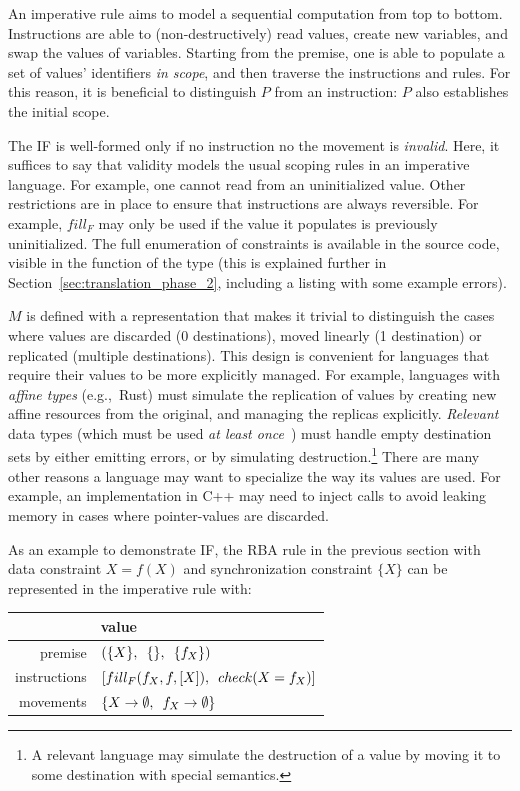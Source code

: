 An imperative rule aims to model a sequential computation from top to bottom. Instructions are able to (non-destructively) read values, create new variables, and swap the values of variables. Starting from the premise, one is able to populate a set of values' identifiers \textit{in scope}, and then traverse the instructions and rules. For this reason, it is beneficial to distinguish $P$ from an instruction: $P$ also establishes the initial scope.

The IF is well-formed only if no instruction no the movement is \textit{invalid}. Here, it suffices to say that validity models the usual scoping rules in an imperative language. For example, one cannot read from an uninitialized value. Other restrictions are in place to ensure that instructions are always reversible. For example, $fill_F$ may only be used if the value it populates is previously uninitialized. The full enumeration of constraints is available in the source code, visible in the  function of the  type (this is explained further in Section~\ref{sec:translation_phase_2}, including a listing with some example errors).

$M$ is defined with a representation that makes it trivial to distinguish the cases where values are discarded (0 destinations), moved linearly (1 destination) or replicated (multiple destinations). This design is convenient for languages that require their values to be more explicitly managed. For example, languages with \textit{affine types} (e.g.,\ Rust) must simulate the replication of values by creating new affine resources from the original, and managing the replicas explicitly.  \textit{Relevant} data types (which must be used \textit{at least once}~\cite{walker2005substructural}) must handle empty destination sets by either emitting errors, or by simulating destruction.\footnote{A relevant language may simulate the destruction of a value by moving it to some  destination with special semantics.} There are many other reasons a language may want to specialize the way its values are used. For example, an implementation in C++ may need to inject  calls to avoid leaking memory in cases where pointer-values are discarded.

As an example to demonstrate IF, the RBA rule in the previous section with data constraint $X=f(X)$
and synchronization constraint $\{X\}$ can be represented in the imperative rule with:

\vspace{1em}
\noindent{}
\begin{tabular}{r|l}
	\centering
	&  value \\ \hline
	premise	&  $(\{X\}, \enskip\{\}, \enskip\{f_X\})$ \\
	instructions	& $[fill_F(f_X, f, [X]), \enskip{} check(X = f_X)]$ \\
	movements	& $\{X \rightarrow{}\emptyset{}, \enskip f_X \rightarrow{}\emptyset{}\}$ 
\end{tabular}
\vspace{1em}

